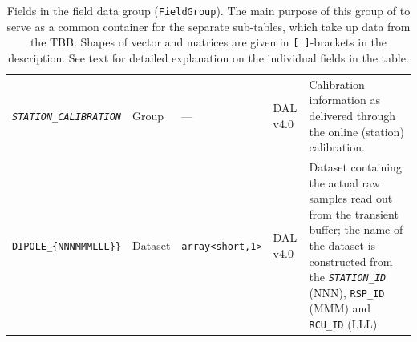 \documentclass[a4paper,10pt,bibtotoc]{scrartcl}
\begin{document}
\begin{table}[htbp]
\begin{tabular}{|llllp{4.5cm}|}
    \hline
    \small \textit{\texttt{STATION\_CALIBRATION}} & Group & --- & DAL v4.0 & Calibration information as delivered through the online (station) calibration. \\
    \small {\texttt{DIPOLE\_\{NNNMMMLLL\}\}}} & Dataset & \verb|array<short,1>| & DAL v4.0 & Dataset containing the actual raw samples read out from the transient buffer; the name of the dataset is constructed from the \small \textit{\texttt{STATION\_ID}} (NNN), \verb|RSP_ID| (MMM) and \verb|RCU_ID| (LLL) \\
  \end{tabular}
  \caption[Fields in the field data group (\texttt{FieldGroup}).]{
    Fields in the field data group (\texttt{FieldGroup}). The
    main purpose of this group of to serve as a common container for the separate
    sub-tables, which take up data from the TBB. Shapes of vector and matrices are given in
    \texttt{[ ]}-brackets in the description. See text for detailed explanation
    on the individual fields in the table.}
  \label{tab:field group}
\end{table}
\end{document}
